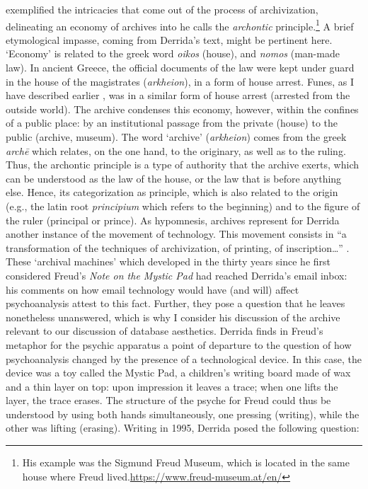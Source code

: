 \textcite{Der95:Arc} exemplified the intricacies that come out of the process of archivization, delineating an economy of archives into he calls the \textit{archontic} principle.\footnote{His example was the Sigmund Freud Museum, which is located in the same house where Freud lived.\url{https://www.freud-museum.at/en/}} A brief etymological impasse, coming from Derrida's text, might be pertinent here. `Economy' is related to the greek word \textit{oikos} (house), and \textit{nomos} (man-made law). In ancient Greece, the official documents of the law were kept under guard in the house of the magistrates (\textit{arkheion}), in a form of house arrest. Funes, as I have described earlier , was in a similar form of house arrest (arrested from the outside world). The archive condenses this economy, however, within the confines of a public place: by an institutional passage from the private (house) to the public (archive, museum). The word `archive' (\textit{arkheion}) comes from the greek \textit{archē} which relates, on the one hand, to the originary, as well as to the ruling. Thus, the archontic principle is a type of authority that the archive exerts, which can be understood as the law of the house, or the law that is before anything else. Hence, its categorization as principle, which is also related to the origin (e.g., the latin root \textit{principium} which refers to the beginning) and to the figure of the ruler (principal or prince). As hypomnesis, archives represent for Derrida another instance of the movement of technology. This movement consists in ``a transformation of the techniques of archivization, of printing, of inscription\dots'' \parencite[16]{Der95:Arc}. These `archival machines' which developed in the thirty years since he first considered Freud's \textit{Note on the Mystic Pad} had reached Derrida's email inbox: his comments on how email technology would have (and will) affect psychoanalysis attest to this fact. Further, they pose a question that he leaves nonetheless unanswered, which is why I consider his discussion of the archive relevant to our discussion of database aesthetics. Derrida finds in Freud's metaphor for the psychic apparatus a point of departure to the question of how psychoanalysis changed by the presence of a technological device. In this case, the device was a toy called the Mystic Pad, a children's writing board made of wax and a thin layer on top: upon impression it leaves a trace; when one lifts the layer, the trace erases. The structure of the psyche for Freud could thus be understood by using both hands simultaneously, one pressing (writing), while the other was lifting (erasing). Writing in 1995, Derrida posed the following question:

